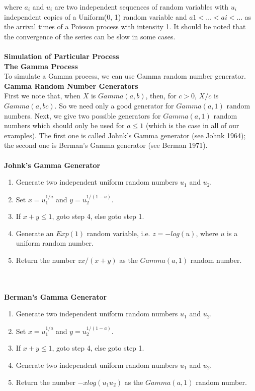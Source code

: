 where {$a_i$} and {$u_i$} are two independent sequences of random variables with $u_i$ independent copies of a Uniform(0, 1) random variable and $a1 < \ldots < ai < \ldots$ as the arrival times of a Poisson process with intensity 1.
It should be noted that the convergence of the series can be slow in some cases.
~\\
~\\
\textbf{Simulation of Particular Process} \\
\textbf{The Gamma Process} \\
To simulate a Gamma process, we can use Gamma random number generator.
~\\
\textbf{Gamma Random Number Generators} \\
First we note that, when $X$ is $Gamma(a,b)$, then, for $c>0$, $X/c$ is $Gamma(a,bc)$. So we need only a good generator for $Gamma(a,1)$ random numbers.
Next, we give two possible generators for $Gamma(a,1)$ random numbers which should only be used for $a\leq1$ (which is the case in all of our examples). The first one is called Johnk’s Gamma generator (see Johnk 1964); the second one is Berman’s
Gamma generator (see Berman 1971).
~\\
~\\
\textbf{Johnk's Gamma Generator} 
\begin{enumerate}
    \item Generate two independent uniform random numbers $u_1$ and $u_2$.
    \item Set $x=u_{1}^{1/a}$ and $y=u_{2}^{1/(1-a)}$.
    \item If $x+y\leq1$, goto step 4, else goto step 1.
    \item Generate an $Exp(1)$ random variable, i.e. $z=-log(u)$, where $u$ is a uniform random number.
    \item Return the number $zx/(x+y)$ as the $Gamma(a,1)$ random number.
\end{enumerate}

~\\
~\\
\textbf{Berman's Gamma Generator} 
\begin{enumerate}
    \item Generate two independent uniform random numbers $u_1$ and $u_2$.
    \item Set $x=u_{1}^{1/a}$ and $y=u_{2}^{1/(1-a)}$.
    \item If $x+y\leq1$, goto step 4, else goto step 1.
    \item Generate two independent uniform random numbers $u_1$ and $u_2$.
    \item Return the number $-x log(u_1u_2)$ as the $Gamma(a,1)$ random number.
\end{enumerate}

